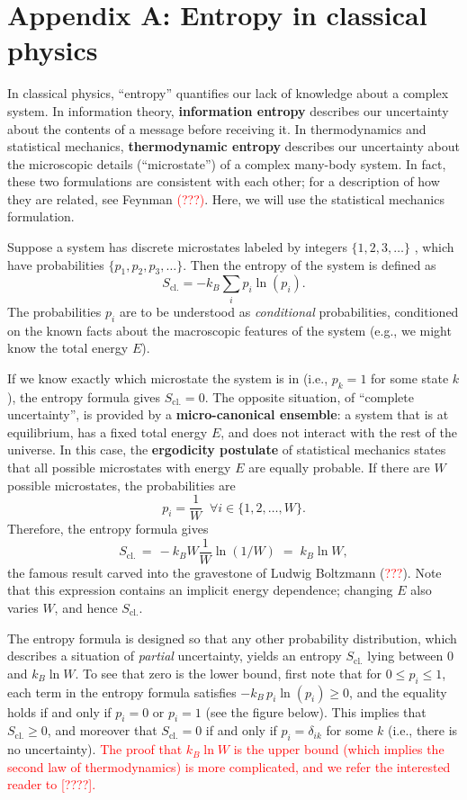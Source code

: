 \documentclass[pra,11pt]{revtex4}
\begin{document}
\section*{Appendix A: Entropy in classical physics}
\label{appendixa}

In classical physics, ``entropy'' quantifies our lack of knowledge
about a complex system.  In information theory, \textbf{information
  entropy} describes our uncertainty about the contents of a message
before receiving it.  In thermodynamics and statistical mechanics,
\textbf{thermodynamic entropy} describes our uncertainty about the
microscopic details (``microstate'') of a complex many-body system.
In fact, these two formulations are consistent with each other; for a
description of how they are related, see Feynman
\textcolor{red}{(???)}.  Here, we will use the statistical mechanics
formulation.

Suppose a system has discrete microstates labeled by integers
$\{1,2,3,\dots\}$ , which have probabilities $\{p_1, p_2, p_3,
\dots\}$.  Then the entropy of the system is defined as
$$S_{\mathrm{cl.}} = - k_B \sum_{i} p_i \ln(p_i).$$
The probabilities $p_i$ are to be understood as \textit{conditional}
probabilities, conditioned on the known facts about the macroscopic
features of the system (e.g., we might know the total energy $E$).

If we know exactly which microstate the system is in (i.e., $p_k = 1$
for some state $k$), the entropy formula gives $S _{\mathrm{cl.}} =
0$.  The opposite situation, of ``complete uncertainty'', is provided
by a \textbf{micro-canonical ensemble}: a system that is at
equilibrium, has a fixed total energy $E$, and does not interact with
the rest of the universe.  In this case, the \textbf{ergodicity
  postulate} of statistical mechanics states that all possible
microstates with energy $E$ are equally probable.  If there are $W$
possible microstates, the probabilities are
$$p_i = \frac{1}{W} \;\;\forall i \in \{1,2,\dots,W\}.$$
Therefore, the entropy formula gives
$$S_{\mathrm{cl.}} \,=\, -k_B W \frac{1}{W} \ln(1/W) \;=\; k_B \ln W,$$
the famous result carved into the gravestone of Ludwig Boltzmann
(\textcolor{red}{???}).  Note that this expression contains an
implicit energy dependence; changing $E$ also varies $W$, and hence
$S_{\mathrm{cl.}}$.

The entropy formula is designed so that any other probability
distribution, which describes a situation of \textit{partial}
uncertainty, yields an entropy $S_{\mathrm{cl.}}$ lying between $0$
and $k_B \ln W$.  To see that zero is the lower bound, first note that
for $0 \le p_i \le 1$, each term in the entropy formula satisfies
$-k_B\, p_i\ln(p_i) \ge 0$, and the equality holds if and only if $p_i
= 0$ or $p_i = 1$ (see the figure below).  This implies that
$S_{\mathrm{cl.}}\ge 0$, and moreover that $S_{\mathrm{cl.}} = 0$ if
and only if $p_i = \delta_{ik}$ for some $k$ (i.e., there is no
uncertainty).  \textcolor{red}{The proof that $k_B \ln W$ is the upper
  bound (which implies the second law of thermodynamics) is more
  complicated, and we refer the interested reader to [????].}
\end{document}
